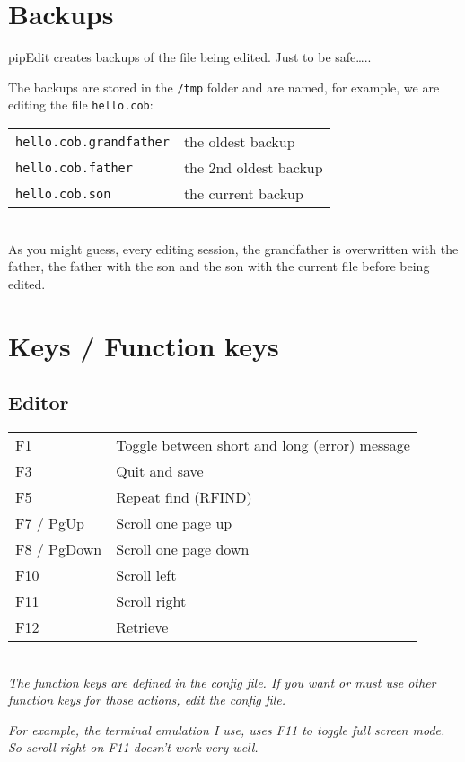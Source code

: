 \documentclass{report}
\begin{document}
\chapter{Backups}

pipEdit creates backups of the file being edited. Just to be safe…..

The backups are stored in the \texttt{/tmp}
folder and are named, for example, we are editing the file 
\texttt{hello.cob}: \\
\break
\begin{tabular}{l l}
\texttt{hello.cob.grandfather}  & the oldest backup \\
\texttt{hello.cob.father} & the 2nd oldest backup \\
\texttt{hello.cob.son} & the current backup \\
\end{tabular} \\
\break
As you might guess, every editing session, the grandfather is overwritten with the father, the father with the son and the son with the current file before being edited.


\chapter{Keys / Function keys}

\section{Editor}

\begin{tabular}{l l}
F1 & Toggle between short and long (error) message \\
F3 & Quit and save \\
F5 & Repeat find (RFIND) \\
F7 / PgUp & Scroll one page up \\
F8 / PgDown & Scroll one page down \\
F10 & Scroll left \\
F11 & Scroll right \\
F12 & Retrieve \\
\end{tabular}
\\

\textit{The function keys are defined in the config file. If you want or must
use other function keys for those actions, edit the config file.}

\textit{For example, the terminal emulation I
use, uses F11 to toggle full screen mode. So scroll right on F11 doesn't work 
very well.}  \\
\end{document}
